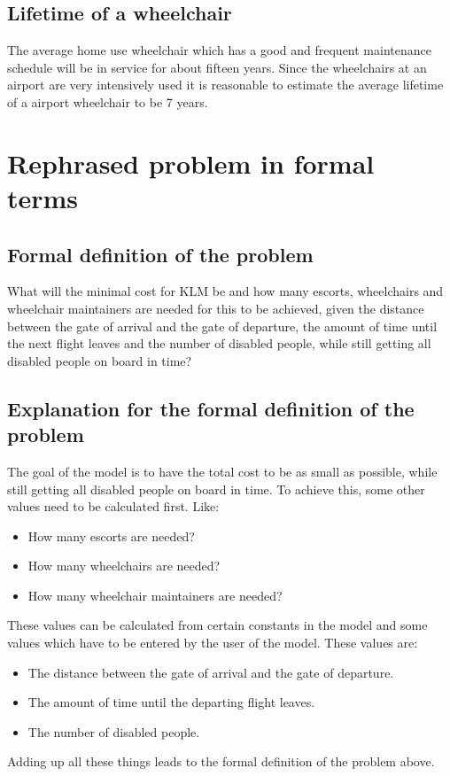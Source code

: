 \documentclass[a4paper, 11pt, notitlepage]{report}
\begin{document}
    \section{Lifetime of a wheelchair}
    The average home use wheelchair which has a good and frequent maintenance schedule will be in service for about fifteen years. Since the wheelchairs at an airport are very intensively used it is reasonable to estimate the average lifetime of a airport wheelchair to be 7 years.
\setcounter{chapter}{+14}
\chapter{Rephrased problem in formal terms}

	\section{Formal definition of the problem}
	What will the minimal cost for KLM be and how many escorts, wheelchairs and wheelchair maintainers are needed for this to be achieved, given the distance between the gate of arrival and the gate of departure, the amount of time until the next flight leaves and the number of disabled people, while still getting all disabled people on board in time?
	
	\section{Explanation for the formal definition of the problem}
	The goal of the model is to have the total cost to be as small as possible, while still getting all disabled people on board in time. To achieve this, some other values need to be calculated first. Like:
\begin{itemize}
\itemsep0em
  \item How many escorts are needed?
  \item How many wheelchairs are needed?
  \item How many wheelchair maintainers are needed?
\end{itemize}
These values can be calculated from certain constants in the model and some values which have to be entered by the user of the model. These values are:
\begin{itemize}
\itemsep0em
  \item The distance between the gate of arrival and the gate of departure.
  \item The amount of time until the departing flight leaves.
  \item The number of disabled people.
\end{itemize}
Adding up all these things leads to the formal definition of the problem above.
\end{document}
